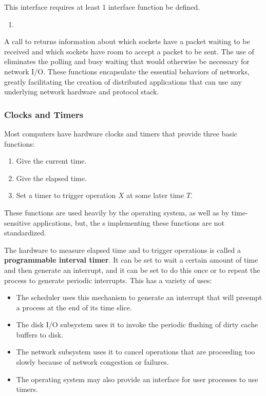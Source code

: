 This interface requires at least 1 interface function be defined.
\begin{enumerate}[noitemsep]
\item {}
\end{enumerate}

A call to  returns information about which sockets have a packet waiting to be received and which sockets have room to accept a packet to be sent.
The use of  eliminates the polling and busy waiting that would otherwise be necessary for network I/O.
These functions encapsulate the essential behaviors of networks, greatly facilitating the creation of distributed applications that can use any underlying network hardware and protocol stack.

\subsubsection{Clocks and Timers}\label{subsubsec:Clocks_Timers}
Most computers have hardware clocks and timers that provide three basic functions:
\begin{enumerate}[noitemsep]
\item Give the current time.
\item Give the elapsed time.
\item Set a timer to trigger operation $X$ at some later time $T$.
\end{enumerate}

These functions are used heavily by the operating system, as well as by time-sensitive applications, but, the s implementing these functions are not standardized.

The hardware to measure elapsed time and to trigger operations is called a \textbf{programmable interval timer}.
It can be set to wait a certain amount of time and then generate an interrupt, and it can be set to do this once or to repeat the process to generate periodic interrupts.
This has a variety of uses:
\begin{itemize}[noitemsep]
\item The scheduler uses this mechanism to generate an interrupt that will preempt a process at the end of its time slice.
\item The disk I/O subsystem uses it to invoke the periodic flushing of dirty cache buffers to disk.
\item The network subsystem uses it to cancel operations that are proceeding too slowly because of network congestion or failures.
\item The operating system may also provide an interface for user processes to use timers.
\end{itemize}

